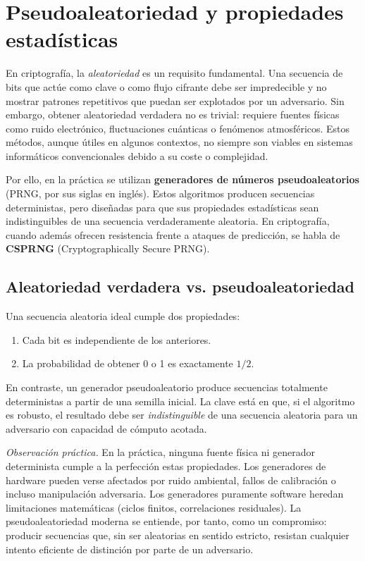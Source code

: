 \chapter{Pseudoaleatoriedad y propiedades estadísticas}

En criptografía, la \textit{aleatoriedad} es un requisito fundamental. Una
secuencia de bits que actúe como clave o como flujo cifrante debe ser
impredecible y no mostrar patrones repetitivos que puedan ser explotados por un
adversario. Sin embargo, obtener aleatoriedad verdadera no es trivial: requiere
fuentes físicas como ruido electrónico, fluctuaciones cuánticas o fenómenos
atmosféricos. Estos métodos, aunque útiles en algunos contextos, no siempre son
viables en sistemas informáticos convencionales debido a su coste o
complejidad.

Por ello, en la práctica se utilizan \textbf{generadores de números
pseudoaleatorios} (PRNG, por sus siglas en inglés). Estos algoritmos producen
secuencias deterministas, pero diseñadas para que sus propiedades estadísticas
sean indistinguibles de una secuencia verdaderamente aleatoria. En criptografía,
cuando además ofrecen resistencia frente a ataques de predicción, se habla de
\textbf{CSPRNG} (Cryptographically Secure PRNG).

\section*{Aleatoriedad verdadera vs. pseudoaleatoriedad}

Una secuencia aleatoria ideal cumple dos propiedades:
\begin{enumerate}
    \item Cada bit es independiente de los anteriores.
    \item La probabilidad de obtener 0 o 1 es exactamente $1/2$.
\end{enumerate}

En contraste, un generador pseudoaleatorio produce secuencias totalmente
deterministas a partir de una semilla inicial. La clave está en que, si el
algoritmo es robusto, el resultado debe ser \textit{indistinguible} de una
secuencia aleatoria para un adversario con capacidad de cómputo acotada.

\medskip
\noindent\textit{Observación práctica.}
En la práctica, ninguna fuente física ni generador determinista cumple a la perfección estas propiedades.
Los generadores de hardware pueden verse afectados por ruido ambiental, fallos de calibración o incluso manipulación adversaria.
Los generadores puramente software heredan limitaciones matemáticas (ciclos finitos, correlaciones residuales).
La pseudoaleatoriedad moderna se entiende, por tanto, como un compromiso: producir secuencias que, sin ser aleatorias en sentido estricto, resistan cualquier intento eficiente de distinción por parte de un adversario.


